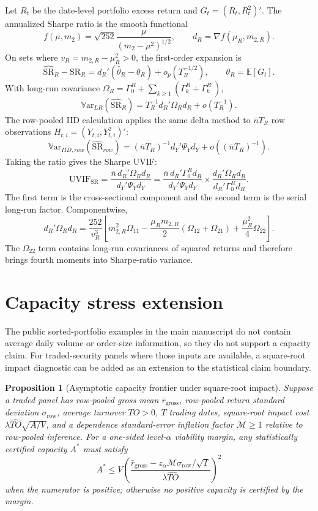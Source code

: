 \documentclass[12pt,a4paper]{article}
\newtheorem{proposition}{Proposition}
\newcommand{\E}{\mathbb{E}}
\newcommand{\Var}{\mathbb{V}\mathrm{ar}}
\newcommand{\SR}{\mathrm{SR}}
\newcommand{\UVIF}{\mathrm{UVIF}}
\begin{document}
Let \(R_t\) be the date-level portfolio excess return and
\(G_t=(R_t,R_t^2)'\).  The annualized Sharpe ratio is the smooth
functional
\[
  f(\mu,m_2)=\sqrt{252}\frac{\mu}{(m_2-\mu^2)^{1/2}},
  \qquad
  d_R=\nabla f(\mu_R,m_{2,R}).
\]
On sets where \(v_R=m_{2,R}-\mu_R^2>0\), the first-order expansion is
\[
  \widehat{\SR}_R-\SR_R
  =
  d_R'(\hat\theta_R-\theta_R)+o_p(T_R^{-1/2}),
  \qquad \theta_R=\E[G_t].
\]
With long-run covariance
\(\Omega_R=\Gamma_0^R+\sum_{k\ge1}(\Gamma_k^R+\Gamma_k^{R\prime})\),
\[
  \Var_{LR}(\widehat{\SR}_R)
  =
  T_R^{-1}d_R'\Omega_Rd_R+o(T_R^{-1}).
\]
The row-pooled IID calculation applies the same delta method to
\(\bar nT_R\) row observations \(H_{t,i}=(Y_{t,i},Y_{t,i}^2)'\):
\[
  \Var_{IID,row}(\widehat{\SR}_{row})
  =
  (\bar nT_R)^{-1}d_Y'\Psi_Yd_Y+o((\bar nT_R)^{-1}).
\]
Taking the ratio gives the Sharpe UVIF:
\[
  \UVIF_{\SR}
  =
  \frac{\bar n\,d_R'\Omega_Rd_R}{d_Y'\Psi_Yd_Y}
  =
  \frac{\bar n\,d_R'\Gamma_0^Rd_R}{d_Y'\Psi_Yd_Y}
  \times
  \frac{d_R'\Omega_Rd_R}{d_R'\Gamma_0^Rd_R}.
\]
The first term is the cross-sectional component and the second term is
the serial long-run factor.  Componentwise,
\[
  d_R'\Omega_Rd_R
  =
  \frac{252}{v_R^3}
  \left[
    m_{2,R}^2\Omega_{11}
    -\frac{\mu_Rm_{2,R}}{2}(\Omega_{12}+\Omega_{21})
    +\frac{\mu_R^2}{4}\Omega_{22}
  \right].
\]
The \(\Omega_{22}\) term contains long-run covariances of squared
returns and therefore brings fourth moments into Sharpe-ratio variance.

\section{Capacity stress extension}

The public sorted-portfolio examples in the main manuscript do not
contain average daily volume or order-size information, so they do not
support a capacity claim.  For traded-security panels where those inputs
are available, a square-root impact diagnostic can be added as an
extension to the statistical claim boundary.

\begin{proposition}[Asymptotic capacity frontier under square-root impact]
\label{prop:capacity-frontier}
Suppose a traded panel has row-pooled gross mean \(\bar r_{\mathrm{gross}}\),
row-pooled return standard deviation \(\sigma_{\mathrm{row}}\), average turnover
\(\widehat{TO}>0\), \(T\) trading dates, square-root impact cost
\(\lambda \widehat{TO}\sqrt{A/V}\), and a dependence standard-error
inflation factor \(\mathcal M\ge 1\) relative to row-pooled inference.
For a one-sided level-\(\alpha\) viability margin, any statistically
certified capacity \(A^*\) must satisfy
\begin{equation}
  A^*
  \le
  V\left(
    \frac{\bar r_{\mathrm{gross}}
      -z_{\alpha}\mathcal M\sigma_{\mathrm{row}}/\sqrt{T}}
         {\lambda \widehat{TO}}
  \right)^2
  \label{eq:capacity-frontier}
\end{equation}
when the numerator is positive; otherwise no positive capacity is
certified by the margin.
\end{proposition}
\end{document}

